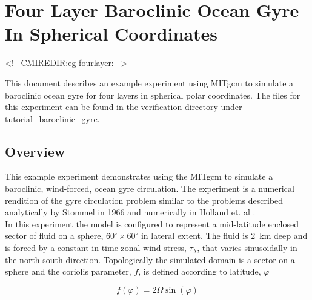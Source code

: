 
\section[Baroclinic Gyre MITgcm Example]{Four Layer Baroclinic Ocean Gyre In Spherical Coordinates}
\label{www:tutorials}
\label{sect:eg-fourlayer}
\begin{rawhtml}
<!-- CMIREDIR:eg-fourlayer: -->
\end{rawhtml}


%
%

This document describes an example experiment using MITgcm
to simulate a baroclinic ocean gyre for four layers in spherical
polar coordinates.  The files for this experiment can be found
in the verification directory under tutorial\_baroclinic\_gyre.

\subsection{Overview}
\label{www:tutorials}

This example experiment demonstrates using the MITgcm to simulate
a baroclinic, wind-forced, ocean gyre circulation. The experiment 
is a numerical rendition of the gyre circulation problem similar
to the problems described analytically by Stommel in 1966 
\cite{Stommel66} and numerically in Holland et. al \cite{Holland75}.
\\

In this experiment the model is configured to represent a mid-latitude 
enclosed sector of fluid on a sphere, $60^{\circ} \times 60^{\circ}$ in 
lateral extent. The fluid is $2$~km deep and is forced
by a constant in time zonal wind stress, $\tau_{\lambda}$, that varies 
sinusoidally in the north-south direction. Topologically the simulated 
domain is a sector on a sphere and the coriolis parameter, $f$, is defined 
according to latitude, $\varphi$

\begin{equation}
\label{EQ:eg-fourlayer-fcori}
f(\varphi) = 2 \Omega \sin( \varphi )
\end{equation}
 
